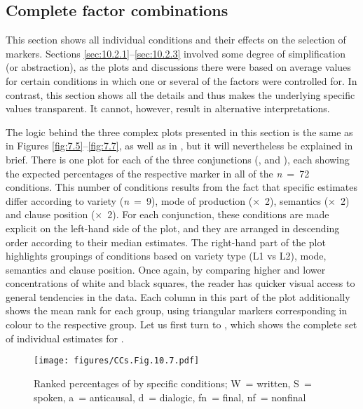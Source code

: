 \subsection{\label{bkm:Ref59531598}Complete factor combinations}\label{sec:10.2.4}

This section shows all individual conditions and their effects on the selection of markers. Sections \ref{sec:10.2.1}–\ref{sec:10.2.3} involved some degree of simplification (or abstraction), as the plots and discussions there were based on average values for certain conditions in which one or several of the factors were controlled for. In contrast, this section shows all the details and thus makes the underlying specific values transparent. It cannot, however, result in alternative interpretations.

The logic behind the three complex plots presented in this section is the same as in Figures \ref{fig:7.5}–\ref{fig:7.7}, as well as in , but it will nevertheless be explained in brief. There is one plot for each of the three conjunctions (,  and ), each showing the expected percentages of the respective marker in all of the \textit{n}~=~72 conditions. This number of conditions results from the fact that specific estimates differ according to variety (\textit{n}~=~9), mode of production (×~2), semantics (×~2) and clause position (×~2). For each conjunction, these conditions are made explicit on the left-hand side of the plot, and they are arranged in descending order according to their median estimates. The right-hand part of the plot highlights groupings of conditions based on variety type (L1 vs L2), mode, semantics and clause position. Once again, by comparing higher and lower concentrations of white and black squares, the reader has quicker visual access to general tendencies in the data. Each column in this part of the plot additionally shows the mean rank for each group, using triangular markers corresponding in colour to the respective group. Let us first turn to , which shows the complete set of individual estimates for .

\begin{figure}
\texttt{[image: figures/CCs.Fig.10.7.pdf]}
\caption{\label{bkm:Ref60240952}\label{fig:10.7}Ranked percentages of  by specific conditions; W~= written, S~= spoken, a~= anticausal, d~= dialogic, fn~= final, nf~= nonfinal}
\end{figure}

